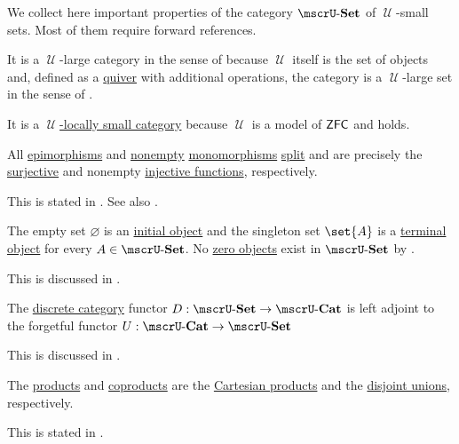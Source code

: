 \begin{proposition}\label{thm:category_of_small_sets_properites}
  We collect here important properties of the category \hyperref[def:category_of_small_sets]{\( \ucat{Set} \)} of \( \mscrU \)-small sets. Most of them require forward references.

  \begin{thmenum}
     It is a \( \mscrU \)-large category in the sense of  because \( \mscrU \) itself is the set of objects and, defined as a \hyperref[def:quiver]{quiver} with additional operations, the category is a \( \mscrU \)-large set in the sense of .

     It is a \hyperref[def:category_size]{\( \mscrU \)-locally small category} because \( \mscrU \) is a model of \hyperref[def:zfc]{\( \textsf{ZFC} \)} and  holds.

     All \hyperref[def:morphism_invertibility/right_cancellative]{epimorphisms} and \hyperref[def:multi_valued_function/empty]{nonempty} \hyperref[def:morphism_invertibility/left_cancellative]{monomorphisms} \hyperref[def:morphism_invertibility/left_invertible]{split} and are precisely the \hyperref[def:function_invertibility/surjective]{surjective} and nonempty \hyperref[def:function_invertibility/injective]{injective functions}, respectively.

    This is stated in . See also .

     The empty set \( \varnothing \) is an \hyperref[def:universal_objects/initial]{initial object} and the singleton set \( \set{ A } \) is a \hyperref[def:universal_objects/terminal]{terminal object} for every \( A \in \ucat{Set} \). No \hyperref[def:universal_objects/zero]{zero objects} exist in \( \ucat{Set} \) by .

    This is discussed in .

     The \hyperref[def:discrete_category]{discrete category} functor \( D: \ucat{Set} \to \ucat{Cat} \) is left adjoint to the forgetful functor \( U: \ucat{Cat} \to \ucat{Set} \)

    This is discussed in .

     The \hyperref[def:discrete_category_limits]{products} and \hyperref[def:discrete_category_limits]{coproducts} are the \hyperref[def:tuple_and_cartesian_product/product]{Cartesian products} and the \hyperref[def:disjoint_union]{disjoint unions}, respectively.

    This is stated in .
  \end{thmenum}
\end{proposition}

